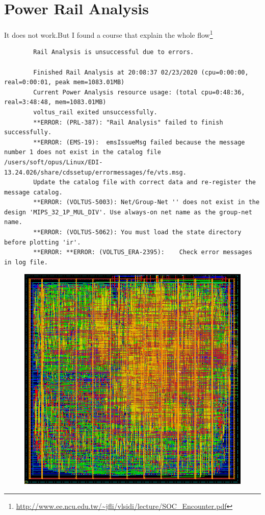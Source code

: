 \documentclass[11pt,a4paper,sans,dvipsnames]{report}
\begin{document}
	\newpage
	\section{Power Rail Analysis}

	It does not work.But I found a course that explain the whole flow\footnote{\url{http://www.ee.ncu.edu.tw/~jfli/vlsidi/lecture/SOC_Encounter.pdf}}
	\begin{lstlisting}
		Rail Analysis is unsuccessful due to errors. 

		Finished Rail Analysis at 20:08:37 02/23/2020 (cpu=0:00:00, real=0:00:01, peak mem=1083.01MB)
		Current Power Analysis resource usage: (total cpu=0:48:36, real=3:48:48, mem=1083.01MB)
		voltus_rail exited unsuccessfully.
		**ERROR: (PRL-387):	"Rail Analysis" failed to finish successfully.
		**ERROR: (EMS-19):	emsIssueMsg failed because the message number 1 does not exist in the catalog file /users/soft/opus/Linux/EDI-13.24.026/share/cdssetup/errormessages/fe/vts.msg.
		Update the catalog file with correct data and re-register the message catalog.
		**ERROR: (VOLTUS-5003):	Net/Group-Net '' does not exist in the design 'MIPS_32_1P_MUL_DIV'. Use always-on net name as the group-net name.
		**ERROR: (VOLTUS-5062):	You must load the state directory before plotting 'ir'.
		**ERROR: **ERROR: (VOLTUS_ERA-2395):	Check error messages in log file.
	\end{lstlisting}

	\begin{figure}[h!]
		\centering
		\includegraphics[width=0.60\linewidth, frame]{images/endresult.png}
		\label{fig:ending}
	\end{figure}

	\newpage
	
	
\end{document}
